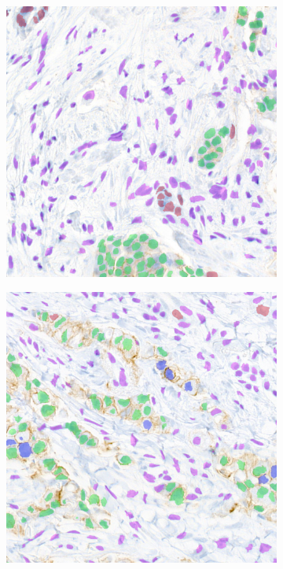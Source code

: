 \begin{figure}[H]
    \centering
    \begin{subfigure}[b]{0.3\textwidth}
    \includegraphics[width=\textwidth]{imgs/qual/breast/gt1.overlay.png}
  \end{subfigure}
  \begin{subfigure}[b]{0.3\textwidth}
    \includegraphics[width=\textwidth]{imgs/qual/breast/gt2.overlay.png}

\end{subfigure}
\end{figure}
